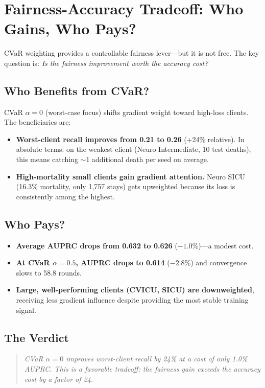 \documentclass[11pt,a4paper]{report}
\begin{document}
\section{Fairness-Accuracy Tradeoff: Who Gains, Who Pays?}

CVaR weighting provides a controllable fairness lever---but it is not free. The key question is: \emph{Is the fairness improvement worth the accuracy cost?}

\subsection{Who Benefits from CVaR?}
CVaR $\alpha=0$ (worst-case focus) shifts gradient weight toward high-loss clients. The beneficiaries are:
\begin{itemize}[leftmargin=2em]
\item \textbf{Worst-client recall improves from 0.21 to 0.26} (+24\% relative). In absolute terms: on the weakest client (Neuro Intermediate, 10 test deaths), this means catching $\sim$1 additional death per seed on average.
\item \textbf{High-mortality small clients gain gradient attention.} Neuro SICU (16.3\% mortality, only 1,757 stays) gets upweighted because its loss is consistently among the highest.
\end{itemize}

\subsection{Who Pays?}
\begin{itemize}[leftmargin=2em]
\item \textbf{Average AUPRC drops from 0.632 to 0.626} ($-1.0\%$)---a modest cost.
\item \textbf{At CVaR $\alpha=0.5$, AUPRC drops to 0.614} ($-2.8\%$) and convergence slows to 58.8 rounds.
\item \textbf{Large, well-performing clients (CVICU, SICU) are downweighted}, receiving less gradient influence despite providing the most stable training signal.
\end{itemize}

\subsection{The Verdict}

\begin{quote}
\emph{CVaR $\alpha=0$ improves worst-client recall by 24\% at a cost of only 1.0\% AUPRC. This is a favorable tradeoff: the fairness gain exceeds the accuracy cost by a factor of 24.}
\end{quote}
\end{document}
